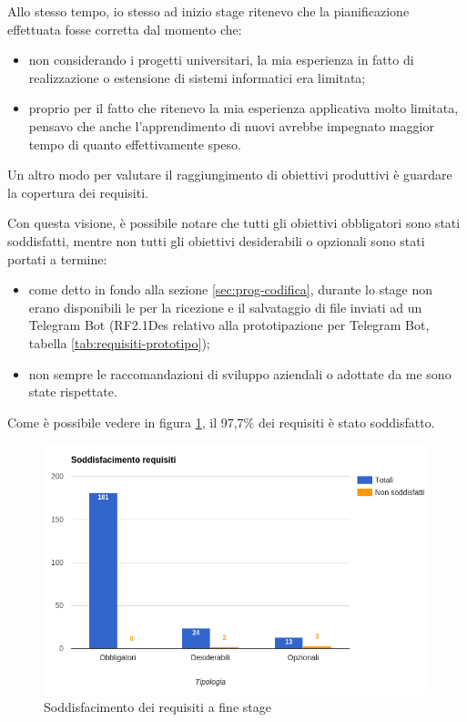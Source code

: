 Allo stesso tempo, io stesso ad inizio stage ritenevo che la pianificazione
effettuata fosse corretta dal momento che:

\begin{itemize}
\item non considerando i progetti universitari, la mia esperienza in fatto di
  realizzazione o estensione di sistemi informatici era limitata;
\item proprio per il fatto che ritenevo la mia esperienza applicativa molto
  limitata, pensavo che anche l'apprendimento di nuovi 
  avrebbe impegnato maggior tempo di quanto effettivamente speso.
\end{itemize}

Un altro modo per valutare il raggiungimento di obiettivi produttivi è guardare
la copertura dei requisiti.

Con questa visione, è possibile notare che tutti gli obiettivi obbligatori sono
stati soddisfatti, mentre non tutti gli obiettivi desiderabili o opzionali
sono stati portati a termine:

\begin{itemize}
\item come detto in fondo alla sezione \ref{sec:prog-codifica}, durante lo
  stage non erano disponibili le  per la ricezione e il salvataggio
  di file inviati ad un Telegram Bot (RF2.1Des relativo alla prototipazione
  per Telegram Bot, tabella \ref{tab:requisiti-prototipo});
\item non sempre le raccomandazioni di sviluppo aziendali o adottate da me sono
  state rispettate.
\end{itemize}

Come è possibile vedere in figura \ref{fig:requisiti-soddisfacimento}, il
97,7\% dei requisiti è stato soddisfatto.

\begin{figure}[H]%
\centering
\includegraphics[width=1.1\columnwidth]{immagini/requisiti}
\caption{Soddisfacimento dei requisiti a fine stage}
\label{fig:requisiti-soddisfacimento}%
\end{figure}

